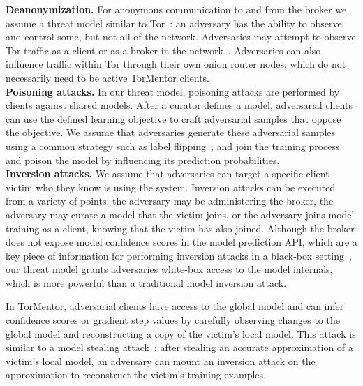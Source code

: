 
\noindent \textbf{Deanonymization.} For anonymous communication to and
from the broker we assume a threat model similar to 
Tor~\cite{Dingledine:2004}: an adversary has the ability to observe
and control some, but not all of the network. Adversaries may attempt
to observe Tor traffic as a client or as a broker in the 
network~\cite{Murdoch:2005, Evans:2009, Johnson:2013}. Adversaries can
also influence traffic within Tor through their own onion router
nodes, which do not necessarily need to be active TorMentor clients.
\\

\noindent \textbf{Poisoning attacks.} In our threat model, poisoning
attacks are performed by clients against shared models. After a
curator defines a model, adversarial clients can use the defined
learning objective to craft adversarial samples that oppose the
objective. We assume that adversaries generate these adversarial
samples using a common strategy such as label 
flipping~\cite{Biggio:2012}, and join the training process and poison
the model by influencing its prediction probabilities. \\

\noindent \textbf{Inversion attacks.} We assume that adversaries can
target a specific client victim who they know is using the system.
Inversion attacks can be executed from a variety of points: the
adversary may be administering the broker, the adversary may curate a
model that the victim joins, or the adversary joins model training as
a client, knowing that the victim has also joined. Although the broker
does not expose model confidence scores in the model prediction API,
which are a key piece of information for performing inversion attacks
in a black-box setting~\cite{Fredrikson:2015}, our threat model grants
adversaries white-box access to the model internals, which is more
powerful than a traditional model inversion attack. 

In TorMentor, adversarial clients have access to the global model and
can infer confidence scores or gradient step values by carefully
observing changes to the global model and reconstructing a copy of the
victim's local model. This attack is similar to a model stealing
attack~\cite{Tramer:2016}: after stealing an accurate approximation of
a victim's local model, an adversary can mount an inversion attack on
the approximation to reconstruct the victim's training examples. \\

